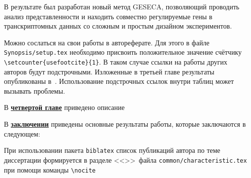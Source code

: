 В результате был разработан новый метод GESECA, позволяющий проводить анализ представленности и находить совместно регулируемые гены в транскриптомных данных со сложным и простым дизайном экспериментов.


Можно сослаться на свои работы в автореферате. Для этого в файле
\verb!Synopsis/setup.tex! необходимо присвоить положительное значение
счётчику \verb!\setcounter{usefootcite}{1}!. В таком случае ссылки на
работы других авторов будут подстрочными.
Изложенные в третьей главе результаты опубликованы в~\cite{vakbib1, vakbib2}.
Использование подстрочных ссылок внутри таблиц может вызывать проблемы.


В \underline{\textbf{четвертой главе}} приведено описание

\FloatBarrier
{}                                  %
В \underline{\textbf{заключении}} приведены основные результаты работы, которые заключаются в следующем:


При использовании пакета \verb!biblatex! список публикаций автора по теме
диссертации формируется в разделе <<\publications>>\ файла
\verb!common/characteristic.tex!  при помощи команды \verb!\nocite!

